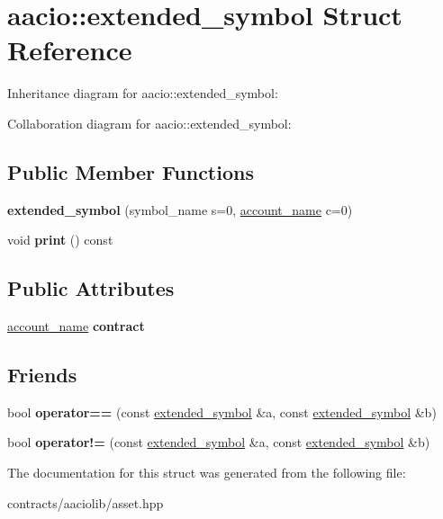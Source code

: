 \hypertarget{structaacio_1_1extended__symbol}{}\section{aacio\+:\+:extended\+\_\+symbol Struct Reference}
\label{structaacio_1_1extended__symbol}


Inheritance diagram for aacio\+:\+:extended\+\_\+symbol\+:


Collaboration diagram for aacio\+:\+:extended\+\_\+symbol\+:
\subsection*{Public Member Functions}
\begin{DoxyCompactItemize}
\item 
\mbox{\label{structaacio_1_1extended__symbol_a85af6b92c428bca0beebe24e5866394d}} 
{\bfseries extended\+\_\+symbol} (symbol\+\_\+name s=0, \mbox{\hyperlink{structaacio_1_1chain_1_1name}{account\+\_\+name}} c=0)
\item 
\mbox{\label{structaacio_1_1extended__symbol_aa28c29b1fc563d6a2591d0a8bdf85485}} 
void {\bfseries print} () const
\end{DoxyCompactItemize}
\subsection*{Public Attributes}
\begin{DoxyCompactItemize}
\item 
\mbox{\label{structaacio_1_1extended__symbol_a2183c62382ea2e5b501329de009d3f84}} 
\mbox{\hyperlink{structaacio_1_1chain_1_1name}{account\+\_\+name}} {\bfseries contract}
\end{DoxyCompactItemize}
\subsection*{Friends}
\begin{DoxyCompactItemize}
\item 
\mbox{\label{structaacio_1_1extended__symbol_a41a1ad9ac465998a69d783b274d4a1f1}} 
bool {\bfseries operator==} (const \mbox{\hyperlink{structaacio_1_1extended__symbol}{extended\+\_\+symbol}} \&a, const \mbox{\hyperlink{structaacio_1_1extended__symbol}{extended\+\_\+symbol}} \&b)
\item 
\mbox{\label{structaacio_1_1extended__symbol_ac78dc0aa08ffd1471b4cb34d4a9f429b}} 
bool {\bfseries operator!=} (const \mbox{\hyperlink{structaacio_1_1extended__symbol}{extended\+\_\+symbol}} \&a, const \mbox{\hyperlink{structaacio_1_1extended__symbol}{extended\+\_\+symbol}} \&b)
\end{DoxyCompactItemize}


The documentation for this struct was generated from the following file\+:\begin{DoxyCompactItemize}
\item 
contracts/aaciolib/asset.\+hpp\end{DoxyCompactItemize}

